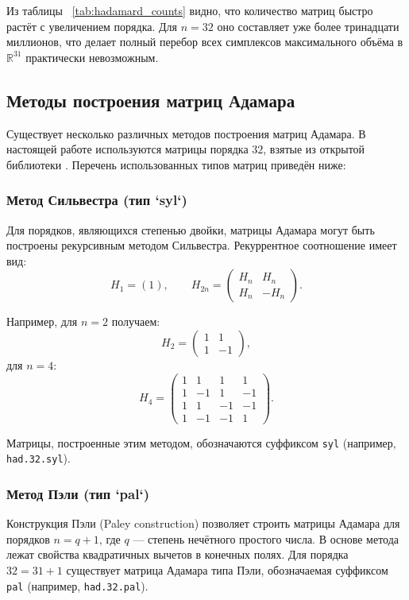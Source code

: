 \documentclass[main]{subfiles}
\begin{document}
Из таблицы ~\ref{tab:hadamard_counts} видно, что количество матриц быстро растёт с увеличением порядка. Для $n = 32$ оно составляет уже более тринадцати миллионов, что делает полный перебор всех симплексов максимального объёма в $\mathbb{R}^{31}$ практически невозможным.

\subsection{Методы построения матриц Адамара}

Существует несколько различных методов построения матриц Адамара. В настоящей работе используются матрицы порядка $32$, взятые из открытой библиотеки \cite{sloane_hadamard}. Перечень использованных типов матриц приведён ниже:

\subsubsection{Метод Сильвестра (тип `syl`)}

Для порядков, являющихся степенью двойки, матрицы Адамара могут быть построены рекурсивным методом Сильвестра. Рекуррентное соотношение имеет вид:
\[
H_{1} = (1), \qquad H_{2n} = \begin{pmatrix}
H_n & H_n \\
H_n & -H_n
\end{pmatrix}.
\]

Например, для $n = 2$ получаем:
\[
H_2 = \begin{pmatrix}
1 & 1 \\
1 & -1
\end{pmatrix},
\]
для $n = 4$:
\[
H_4 = \begin{pmatrix}
1 & 1 & 1 & 1 \\
1 & -1 & 1 & -1 \\
1 & 1 & -1 & -1 \\
1 & -1 & -1 & 1
\end{pmatrix}.
\]

Матрицы, построенные этим методом, обозначаются суффиксом \texttt{syl} (например, \texttt{had.32.syl}).

\subsubsection{Метод Пэли (тип `pal`)}

Конструкция Пэли (Paley construction) позволяет строить матрицы Адамара для порядков $n = q + 1$, где $q$ — степень нечётного простого числа. В основе метода лежат свойства квадратичных вычетов в конечных полях. Для порядка $32 = 31 + 1$ существует матрица Адамара типа Пэли, обозначаемая суффиксом \texttt{pal} (например, \texttt{had.32.pal}).
\end{document}
